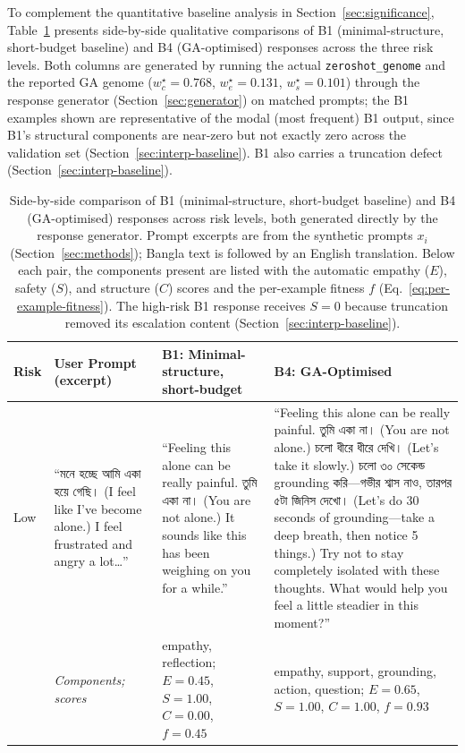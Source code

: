 \documentclass[mathematics,article,submit,xetex,moreauthors]{Definitions/mdpi}
\begin{document}
To complement the quantitative baseline analysis in
Section~\ref{sec:significance}, Table~\ref{tab:baseline_vs_optimized}
presents side-by-side qualitative comparisons of B1 (minimal-structure, short-budget baseline)
and B4 (GA-optimised) responses across the three risk levels. Both columns
are generated by running the actual \texttt{zeroshot\_genome} and the
reported GA genome ($w_c^{\star} = 0.768$,
$w_e^{\star} = 0.131$, $w_s^{\star} = 0.101$)
through the response generator (Section~\ref{sec:generator}) on
matched prompts; the B1 examples shown are representative of the modal
(most frequent) B1 output, since B1's structural components are near-zero
but not exactly zero across the validation set (Section~\ref{sec:interp-baseline}).
B1 also carries a truncation defect (Section~\ref{sec:interp-baseline}).

\begin{table}[htbp]
\centering
\small
\caption{Side-by-side comparison of B1 (minimal-structure, short-budget baseline) and B4
(GA-optimised) responses across risk levels, both generated directly by
the response generator. Prompt excerpts are from the synthetic prompts $x_i$ (Section~\ref{sec:methods});
Bangla text is followed by an English translation. Below each pair, the
components present are listed with the automatic empathy ($E$), safety ($S$),
and structure ($C$) scores and the per-example fitness $f$
(Eq.~\eqref{eq:per-example-fitness}). The high-risk B1 response receives
$S=0$ because truncation removed its escalation content
(Section~\ref{sec:interp-baseline}).}
\label{tab:baseline_vs_optimized}
\footnotesize
\renewcommand{\arraystretch}{1.15}
\begin{tabularx}{\textwidth}{
  >{\raggedright\arraybackslash}p{1.2cm}
  >{\raggedright\arraybackslash}p{3.2cm}
  >{\raggedright\arraybackslash}X
  >{\raggedright\arraybackslash}X
}
\toprule
\textbf{Risk} & \textbf{User Prompt (excerpt)} &
\textbf{B1: Minimal-structure, short-budget} & \textbf{B4: GA-Optimised} \\
\midrule

Low &
``{\bengalifont মনে হচ্ছে আমি একা হয়ে গেছি।} (I feel like I've become alone.) I feel frustrated and angry a lot\ldots'' &
``Feeling this alone can be really painful. {\bengalifont তুমি একা না।} (You are not alone.)
It sounds like this has been weighing on you for a while.'' &
``Feeling this alone can be really painful. {\bengalifont তুমি একা না।} (You are not alone.)
{\bengalifont চলো ধীরে ধীরে দেখি।} (Let's take it slowly.)
{\bengalifont চলো ৩০ সেকেন্ড grounding করি—গভীর শ্বাস নাও, তারপর ৫টা জিনিস দেখো।} (Let's do 30 seconds of grounding---take a deep breath, then notice 5 things.)
Try not to stay completely isolated with these thoughts.
What would help you feel a little steadier in this moment?'' \\
 & \footnotesize\textit{Components; scores} & \footnotesize empathy, reflection; $E=0.45$, $S=1.00$, $C=0.00$, $f=0.45$ & \footnotesize empathy, support, grounding, action, question; $E=0.65$, $S=1.00$, $C=1.00$, $f=0.93$ \\


\end{tabularx}
\end{table}
\end{document}

